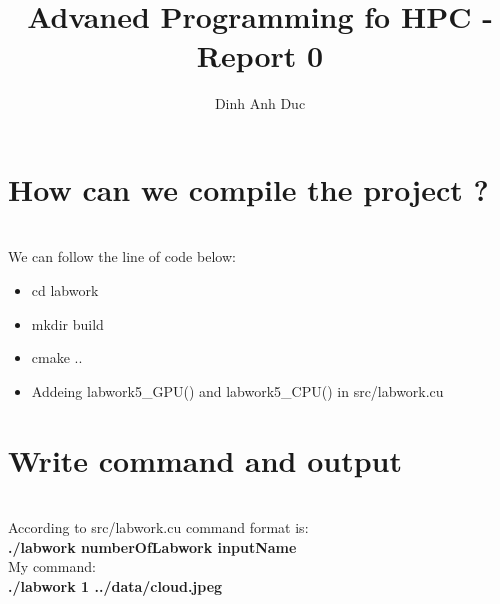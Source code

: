 \documentclass{article}
\title{Advaned Programming fo HPC - Report 0}
\author{Dinh Anh Duc}
\begin{document}
\maketitle

\section*{How can we compile the project ?}
\\
We can follow the line of code below:
\begin{itemize}
\item cd labwork
\item mkdir build
\item cmake ..
\item Addeing labwork5\_GPU() and labwork5\_CPU() in src/labwork.cu
\end{itemize}

\section*{Write command and output}
\\
According to src/labwork.cu command format is:
\\
\textbf{./labwork \<numberOfLabwork\> \<inputName\>}
\\
My command: 
\\
\textbf{./labwork 1 ../data/cloud.jpeg}
\end{document}
